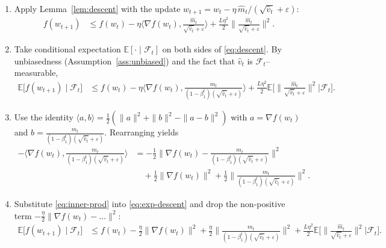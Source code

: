 \documentclass{article}
\newcommand{\E}{\mathbb{E}}
\begin{document}
\begin{enumerate}
\item[Step 1.] Apply Lemma~\ref{lem:descent} with the update $w_{t+1}=w_t-\eta\,\hat m_t/(\sqrt{\hat v_t}+\varepsilon)$:
\begin{align}
f(w_{t+1}) &\le f(w_t)-\eta\Big\langle\nabla f(w_t),\frac{\hat m_t}{\sqrt{\hat v_t}+\varepsilon}\Big\rangle
+\frac{L\eta^2}{2}\Big\|\frac{\hat m_t}{\sqrt{\hat v_t}+\varepsilon}\Big\|^2 .
\label{eq:descent}
\end{align}

\item[Step 2.] Take conditional expectation $\E[\cdot\mid\mathcal{F}_{t}]$ on both sides of \eqref{eq:descent}. By unbiasedness (Assumption~\ref{ass:unbiased}) and the fact that $\hat v_t$ is $\mathcal{F}_{t}$–measurable,
\begin{align}
\E\!\big[f(w_{t+1})\mid\mathcal{F}_{t}\big]
&\le f(w_t)-\eta\Big\langle\nabla f(w_t),\frac{m_t}{(1-\beta_1^{t})(\sqrt{\hat v_t}+\varepsilon)}\Big\rangle
+\frac{L\eta^2}{2}\E\!\Big[\Big\|\frac{\hat m_t}{\sqrt{\hat v_t}+\varepsilon}\Big\|^2\Big|\mathcal{F}_{t}\Big].
\label{eq:exp-descent}
\end{align}

\item[Step 3.] Use the identity $\langle a,b\rangle = \frac12(\|a\|^2+\|b\|^2-\|a-b\|^2)$ with $a=\nabla f(w_t)$ and $b=\frac{m_t}{(1-\beta_1^{t})(\sqrt{\hat v_t}+\varepsilon)}$. Rearranging yields
\begin{align}
-\Big\langle\nabla f(w_t),\frac{m_t}{(1-\beta_1^{t})(\sqrt{\hat v_t}+\varepsilon)}\Big\rangle
&= -\frac12\Big\|\nabla f(w_t)-\frac{m_t}{(1-\beta_1^{t})(\sqrt{\hat v_t}+\varepsilon)}\Big\|^2 \nonumber\\
&\quad +\frac12\|\nabla f(w_t)\|^2
+\frac12\Big\|\frac{m_t}{(1-\beta_1^{t})(\sqrt{\hat v_t}+\varepsilon)}\Big\|^2 .
\label{eq:inner-prod}
\end{align}

\item[Step 4.] Substitute \eqref{eq:inner-prod} into \eqref{eq:exp-descent} and drop the non‑positive term $-\frac{\eta}{2}\big\|\nabla f(w_t)-\dots\big\|^2$:
\begin{align}
\E\!\big[f(w_{t+1})\mid\mathcal{F}_{t}\big]
&\le f(w_t)-\frac{\eta}{2}\|\nabla f(w_t)\|^2
+\frac{\eta}{2}\Big\|\frac{m_t}{(1-\beta_1^{t})(\sqrt{\hat v_t}+\varepsilon)}\Big\|^2
+\frac{L\eta^2}{2}\E\!\Big[\Big\|\frac{\hat m_t}{\sqrt{\hat v_t}+\varepsilon}\Big\|^2\Big|\mathcal{F}_{t}\Big].
\label{eq:post-inner}
\end{align}


\end{enumerate}
\end{document}
